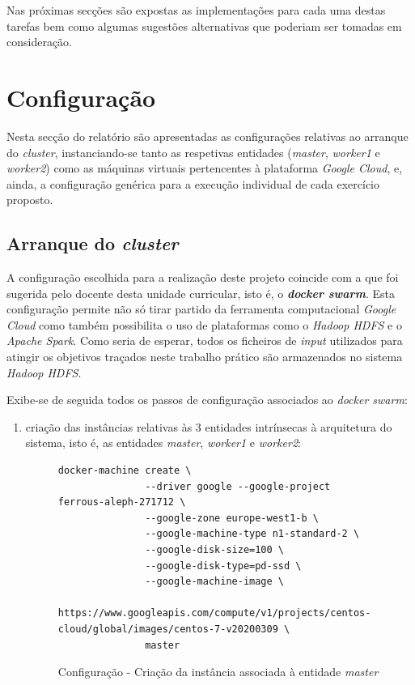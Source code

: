 \documentclass[a4paper]{report}
\begin{document}
{    Nas próximas secções são expostas as implementações para cada uma destas tarefas bem como algumas sugestões alternativas que poderiam ser tomadas em consideração.

    \section{Configuração} \label{sec:Configuration}
        Nesta secção do relatório são apresentadas as configurações relativas ao arranque do \textit{cluster}, instanciando-se tanto as respetivas entidades (\textsl{master}, \textsl{worker1} e \textsl{worker2}) como as máquinas virtuais pertencentes à plataforma \textit{Google Cloud}, e, ainda, a configuração genérica para a execução individual de cada exercício proposto. 

        \subsection{Arranque do \textit{cluster}} \label{subsec:Configuration-Cluster}
            A configuração escolhida para a realização deste projeto coincide com a que foi sugerida pelo docente desta unidade curricular, isto é, o \textbf{\textit{docker swarm}}.
            Esta configuração permite não só tirar partido da ferramenta computacional \textit{Google Cloud} como também possibilita o uso de plataformas como o \textit{Hadoop HDFS} e o \textit{Apache Spark}.
            Como seria de esperar, todos os ficheiros de \textit{input} utilizados para atingir os objetivos traçados neste trabalho prático são armazenados no sistema \textit{Hadoop HDFS}.
            
            Exibe-se de seguida todos os passos de configuração associados ao \textit{docker swarm}:
            \begin{enumerate}[label=\textbf{\arabic*.}]
                \item criação das instâncias relativas às 3 entidades intrínsecas à arquitetura do sistema, isto é, as entidades \textsl{master}, \textsl{worker1} e \textsl{worker2}:
                \begin{figure}[H]
                    \centering
                    \begin{verbatim}
docker-machine create \
               --driver google --google-project ferrous-aleph-271712 \
               --google-zone europe-west1-b \
               --google-machine-type n1-standard-2 \
               --google-disk-size=100 \
               --google-disk-type=pd-ssd \
               --google-machine-image \
       https://www.googleapis.com/compute/v1/projects/centos-cloud/global/images/centos-7-v20200309 \
               master
                    \end{verbatim}
                    \vspace{-5mm}
                    \caption{Configuração - Criação da instância associada à entidade \textsl{master}}
                    \label{fig:1}
                \end{figure}
                

\end{enumerate}}
\end{document}
